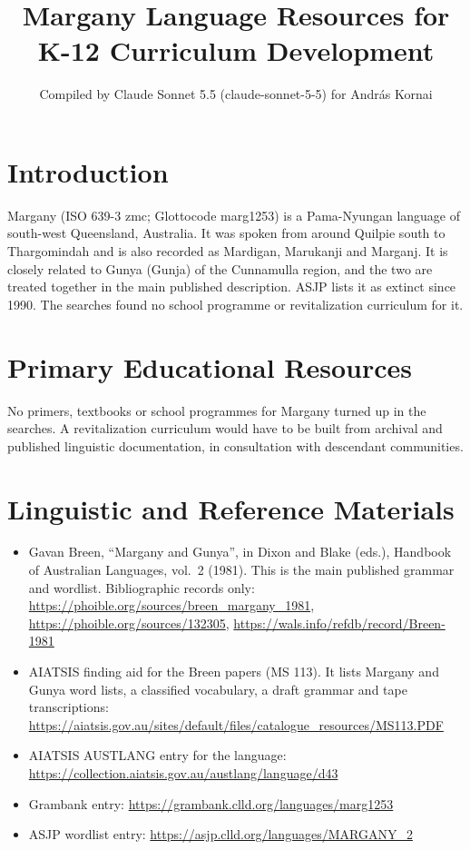 \documentclass[12pt]{article}
\title{Margany Language Resources for K-12 Curriculum Development}
\author{Compiled by Claude Sonnet 5.5 (claude-sonnet-5-5) for Andr\'as Kornai}
\date{}
\begin{document}
\maketitle

\section{Introduction}
Margany (ISO 639-3 zmc; Glottocode marg1253) is a Pama-Nyungan language of south-west Queensland, Australia. It was spoken from around Quilpie south to Thargomindah and is also recorded as Mardigan, Marukanji and Marganj. It is closely related to Gunya (Gunja) of the Cunnamulla region, and the two are treated together in the main published description. ASJP lists it as extinct since 1990. The searches found no school programme or revitalization curriculum for it.

\section{Primary Educational Resources}
No primers, textbooks or school programmes for Margany turned up in the searches. A revitalization curriculum would have to be built from archival and published linguistic documentation, in consultation with descendant communities.

\section{Linguistic and Reference Materials}
\begin{itemize}
\item Gavan Breen, ``Margany and Gunya'', in Dixon and Blake (eds.), Handbook of Australian Languages, vol.\ 2 (1981). This is the main published grammar and wordlist. Bibliographic records only: \url{https://phoible.org/sources/breen_margany_1981}, \url{https://phoible.org/sources/132305}, \url{https://wals.info/refdb/record/Breen-1981}
\item AIATSIS finding aid for the Breen papers (MS 113). It lists Margany and Gunya word lists, a classified vocabulary, a draft grammar and tape transcriptions: \url{https://aiatsis.gov.au/sites/default/files/catalogue_resources/MS113.PDF}
\item AIATSIS AUSTLANG entry for the language: \url{https://collection.aiatsis.gov.au/austlang/language/d43}
\item Grambank entry: \url{https://grambank.clld.org/languages/marg1253}
\item ASJP wordlist entry: \url{https://asjp.clld.org/languages/MARGANY_2}
\end{itemize}
\end{document}
